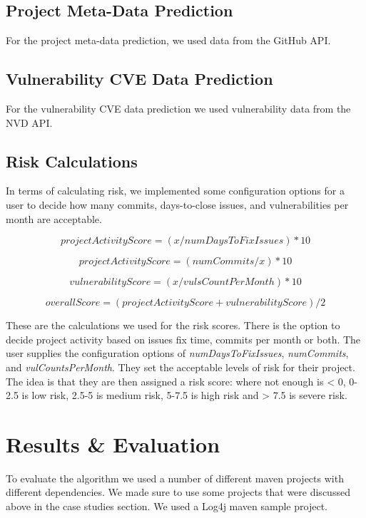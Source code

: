 \documentclass[10pt, compsoc, conference]{IEEEtran}
\begin{document}
\subsection{Project Meta-Data Prediction}
For the project meta-data prediction, we used data from the GitHub API. 

\subsection{Vulnerability CVE Data Prediction}
For the vulnerability CVE data prediction we used vulnerability data from the NVD API.

\subsection{Risk Calculations}
In terms of calculating risk, we implemented some configuration options for a user to decide how many commits, days-to-close issues, and vulnerabilities per month are acceptable. 

\[ projectActivityScore = ( x / numDaysToFixIssues ) * 10\]

\[ projectActivityScore = ( numCommits / x ) * 10\]

\[vulnerabilityScore = ( x / vulsCountPerMonth ) * 10\]

\[overallScore = ( projectActivityScore + vulnerabilityScore) / 2\]

These are the calculations we used for the risk scores. There is the option to decide project activity based on issues fix time, commits per month or both. The user supplies the configuration options of \textit{numDaysToFixIssues}, \textit{numCommits}, and \textit{vulCountsPerMonth}. They set the acceptable levels of risk for their project. The idea is that they are then assigned a risk score: where not enough is < 0, 0-2.5 is low risk, 2.5-5 is medium risk, 5-7.5 is high risk and > 7.5 is severe risk. 


\section{Results \& Evaluation}
To evaluate the algorithm we used a number of different maven projects with different dependencies. We made sure to use some projects that were discussed above in the case studies section. We used a Log4j maven sample project. 
\end{document}
